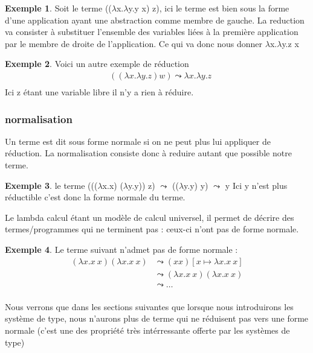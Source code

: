 \documentclass {article}
\theoremstyle{definition}
\newtheorem{example}{Exemple}
\theoremstyle{remark}
\begin{document}
\begin{example}
  Soit le terme ((\(\lambda\)x.\(\lambda\)y.y x) z), ici
  le terme est bien sous la forme d'une application ayant une abstraction comme 
  membre de gauche. La reduction va consister à substituer l'ensemble des 
  variables liées à la première application par le membre de droite de 
  l'application. Ce qui va donc nous donner \(\lambda\)x.\(\lambda\)y.z x
\end{example}

\begin{example}
  Voici un autre exemple de réduction
  \begin{align*}
    & ((\lambda x .\lambda y. z) w) \leadsto \lambda x.\lambda y.z \\
  \end{align*}
  Ici z étant une variable libre il n'y a rien à réduire.
\end{example}


\subsubsection{normalisation}

Un terme est dit sous forme normale si on ne peut plus lui appliquer 
de réduction. La normalisation consiste donc à reduire autant que possible
notre terme.
\begin{example}
  le terme (((\(\lambda\)x.x) (\(\lambda\)y.y)) z) \(\leadsto\) ((\(\lambda\)y.y) y) 
\(\leadsto\) y %
  Ici y n'est plus réductible c'est donc la forme normale du terme.
\end{example}

Le lambda calcul étant un modèle de calcul universel, il permet de 
décrire des termes/programmes qui ne terminent pas : ceux-ci n'ont pas 
de forme normale.

\begin{example}
 
  Le terme suivant n'admet pas de forme normale :
  \begin{align*}
  (\lambda x. x\: x) (\lambda x. x\: x) &\leadsto (x x)[x \mapsto \lambda x. x\: x] \\
                                        &\leadsto (\lambda x. x\: x) (\lambda x. x\: x) \\
                                        &\leadsto \ldots \\
  \end{align*}
\end{example}
Nous verrons que dans les sections suivantes que lorsque nous introduirons 
les système de type, nous n'aurons plus de terme qui ne réduisent pas vers 
une forme normale (c'est une des propriété très intérressante offerte par 
les systèmes de type)
\end{document}
